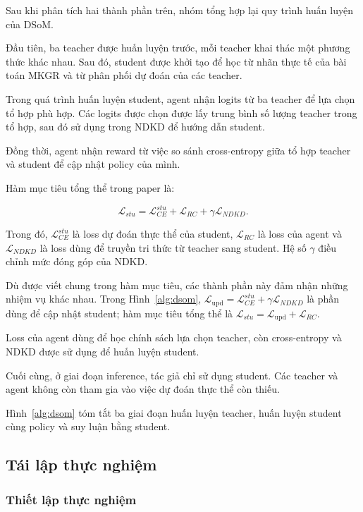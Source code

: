 Sau khi phân tích hai thành phần trên, nhóm
tổng hợp lại quy trình huấn luyện của DSoM.

Đầu tiên, ba teacher được huấn luyện trước,
mỗi teacher khai thác một phương thức khác
nhau. Sau đó, student được khởi tạo để học
từ nhãn thực tế của bài toán MKGR và từ
phân phối dự đoán của các teacher.

Trong quá trình huấn luyện student, agent
nhận logits từ ba teacher để lựa chọn tổ
hợp phù hợp. Các logits được chọn được lấy
trung bình số lượng teacher trong tổ hợp, sau đó sử dụng trong NDKD để
hướng dẫn student.

Đồng thời, agent nhận reward từ việc so
sánh cross-entropy giữa tổ hợp teacher
và student để cập nhật policy của mình.

Hàm mục tiêu tổng thể trong paper là:

\begin{equation}
\mathcal{L}_{stu}
=\mathcal{L}^{stu}_{CE}
+\mathcal{L}_{RC}
+\gamma\mathcal{L}_{NDKD}.
\end{equation}

Trong đó, $\mathcal{L}^{stu}_{CE}$ là loss
dự đoán thực thể của student,
$\mathcal{L}_{RC}$ là loss của agent và
$\mathcal{L}_{NDKD}$ là loss dùng để truyền
tri thức từ teacher sang student. Hệ số
$\gamma$ điều chỉnh mức đóng góp của NDKD.

Dù được viết chung trong hàm mục tiêu, các thành phần
này đảm nhận những nhiệm vụ khác nhau. Trong Hình~\ref{alg:dsom},
$\mathcal{L}_{\mathrm{upd}}=\mathcal{L}^{stu}_{CE}
+\gamma\mathcal{L}_{NDKD}$ là phần dùng để cập nhật student;
hàm mục tiêu tổng thể là
$\mathcal{L}_{stu}=\mathcal{L}_{\mathrm{upd}}+\mathcal{L}_{RC}$.

Loss của agent dùng để học chính sách lựa
chọn teacher, còn cross-entropy và NDKD
được sử dụng để huấn luyện student.

Cuối cùng, ở giai đoạn inference, tác giả
chỉ sử dụng student. Các teacher và agent
không còn tham gia vào việc dự đoán thực
thể còn thiếu.

Hình~\ref{alg:dsom} tóm tắt ba giai đoạn huấn luyện teacher,
huấn luyện student cùng policy và suy luận bằng student.





\subsection{Tái lập thực nghiệm}

\subsubsection{Thiết lập thực nghiệm}

